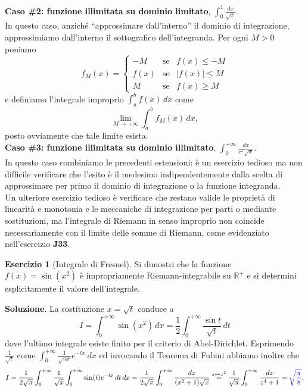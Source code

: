\documentclass[a4paper,twoside]{article}
\newcommand{\R}{\mathbb{R}}
\theoremstyle{definition}
\newtheorem{ex}[theorem]{Esercizio}
\numberwithin{theorem}{section}
\begin{document}
\textbf{Caso \#2: funzione illimitata su dominio limitato}, $\int_{0}^{1}\frac{dx}{\sqrt{x}}$.\\
In questo caso, anziché ``approssimare dall'interno'' il dominio di integrazione, approssimiamo dall'interno il sottografico dell'integranda. Per ogni $M>0$ poniamo
$$ f_M(x) = \left\{\begin{array}{rcl}-M &\text{se}& f(x)\leq -M \\ f(x) & \text{se} & |f(x)|\leq M \\ M &\text{se}& f(x)\geq M\end{array}\right. $$
e definiamo l'integrale improprio $\int_{a}^{b}f(x)\,dx$ come 
$$ \lim_{M\to +\infty} \int_{a}^{b} f_M(x)\,dx, $$
posto ovviamente che tale limite esista.\\

\textbf{Caso \#3: funzione illimitata su dominio illimitato}, $\int_{0}^{+\infty}\frac{dx}{e^x\sqrt{x}}$.\\
In questo caso combiniamo le precedenti estensioni: è un esercizio tedioso ma non difficile verificare che l'esito è il medesimo indipendentemente dalla scelta di approssimare per primo il dominio di integrazione o la funzione integranda.\\

Un ulteriore esercizio tedioso è verificare che restano valide le proprietà di linearità e monotonia e le meccaniche di integrazione per parti o mediante sostituzioni, ma l'integrale di Riemann in senso improprio non coincide necessariamente con il limite delle somme di Riemann, come evidenziato nell'esercizio \textbf{J33}.

\begin{ex}[Integrale di Fresnel] Si dimostri che la funzione $f(x)=\sin(x^2)$ è impropriamente Riemann-integrabile su $\R^+$ e si determini esplicitamente il valore dell'integrale. 
\end{ex}
\textbf{Soluzione}. La sostituzione $x=\sqrt{t}$ conduce a 
$$ I=\int_{0}^{+\infty}\sin(x^2)\,dx = \frac{1}{2}\int_{0}^{+\infty}\frac{\sin t}{\sqrt{t}}\,dt $$ 
dove l'ultimo integrale esiste finito per il criterio di Abel-Dirichlet. Esprimendo $\frac{1}{\sqrt{t}}$ come $\int_{0}^{+\infty}\frac{1}{\sqrt{\pi x}} e^{-tx}\,dx$ ed invocando il Teorema di Fubini abbiamo inoltre che 
$$ I = \frac{1}{2\sqrt{\pi}}\int_{0}^{+\infty}\frac{1}{\sqrt{x}}\int_{0}^{+\infty}\sin(t)e^{-tx}\,dt \,dx = \frac{1}{2\sqrt{\pi}}\int_{0}^{+\infty}\frac{dx}{(x^2+1)\sqrt{x}}\stackrel{x\mapsto z^2}{=}\frac{1}{\sqrt{\pi}}\int_{0}^{+\infty}\frac{dz}{z^4+1}={\color{blue}\sqrt{\frac{\pi}{8}}}. $$
\end{document}
